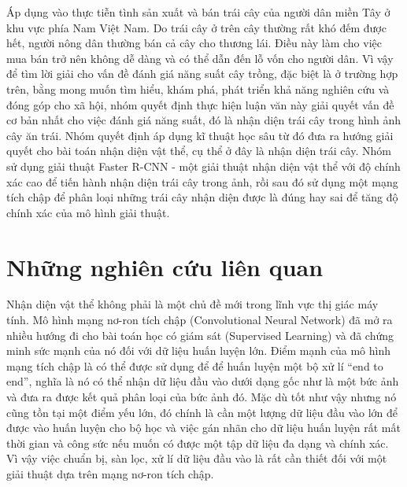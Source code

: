 Áp dụng vào thực tiễn tình sản xuất và bán trái cây của người dân miền Tây ở khu vực phía Nam Việt Nam. Do trái cây ở trên cây thường rất khó đếm được hết, người nông dân thường bán cả cây cho thương lái. Điều này làm cho việc mua bán trở nên không dễ dàng và có thể dẫn đến lỗ vốn cho người dân. Vì vậy để tìm lời giải cho vấn đề đánh giá năng suất cây trồng, đặc biệt là ở trường hợp trên, bằng mong muốn tìm hiểu, khám phá, phát triển khả năng nghiên cứu và đóng góp cho xã hội, nhóm quyết định thực hiện luận văn này giải quyết vấn đề cơ bản nhất cho việc đánh giá năng suất, đó là nhận diện trái cây trong hình ảnh cây ăn trái. Nhóm quyết định áp dụng kĩ thuật học sâu từ đó đưa ra hướng giải quyết cho bài toán nhận diện vật thể, cụ thể ở đây là nhận diện trái cây. Nhóm sử dụng giải thuật Faster R-CNN - một giải thuật nhận diện vật thể với độ chính xác cao để tiến hành nhận diện trái cây trong ảnh, rồi sau đó sử dụng một mạng tích chập để phân loại những trái cây nhận diện được là đúng hay sai để tăng độ chính xác của mô hình giải thuật.

\section{Những nghiên cứu liên quan}
Nhận diện vật thể không phải là một chủ đề mới trong lĩnh vực thị giác máy tính. Mô hình mạng nơ-ron tích chập (Convolutional Neural Network) đã mở ra nhiều hướng đi cho bài toán học có giám sát (Supervised Learning) và đã chứng minh sức mạnh của nó đối với dữ liệu huấn luyện lớn. Điểm mạnh của mô hình mạng tích chập là có thể được sử dụng để để huấn luyện một bộ xử lí “end to end”, nghĩa là nó có thể nhận dữ liệu đầu vào dưới dạng gốc như là một bức ảnh và đưa ra được kết quả phân loại của bức ảnh đó. Mặc dù tốt như vậy nhưng nó cũng tồn tại một điểm yếu lớn, đó chính là cần một lượng dữ liệu đầu vào lớn để được vào huấn luyện cho bộ học và việc gán nhãn cho dữ liệu huấn luyện rất mất thời gian và công sức nếu muốn có được một tập dữ liệu đa dạng và chính xác. Vì vậy việc chuẩn bị, sàn lọc, xử lí dữ liệu đầu vào là rất cần thiết đối với một giải thuật dựa trên mạng nơ-ron tích chập.


